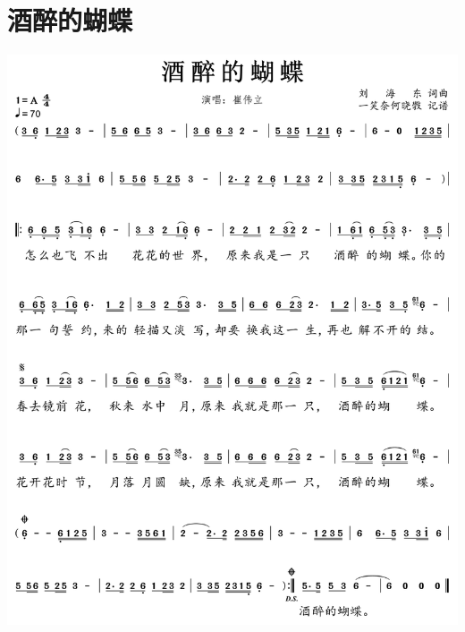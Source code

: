 \documentclass[cn,pad,twocol]{elegantbook}
\begin{document}
\section{酒醉的蝴蝶} \includegraphics[width=\textwidth]{macos/20210208酒醉的蝴蝶.png}
\end{document}
